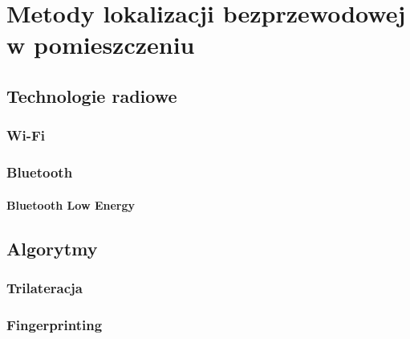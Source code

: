 \chapter{Metody lokalizacji bezprzewodowej w pomieszczeniu}
\label{ch:metody-lokalizacji}

\section{Technologie radiowe}

\subsection{Wi-Fi}

\subsection{Bluetooth}
\subsubsection{Bluetooth Low Energy}

\section{Algorytmy}

\subsection{Trilateracja}

\subsection{Fingerprinting}


